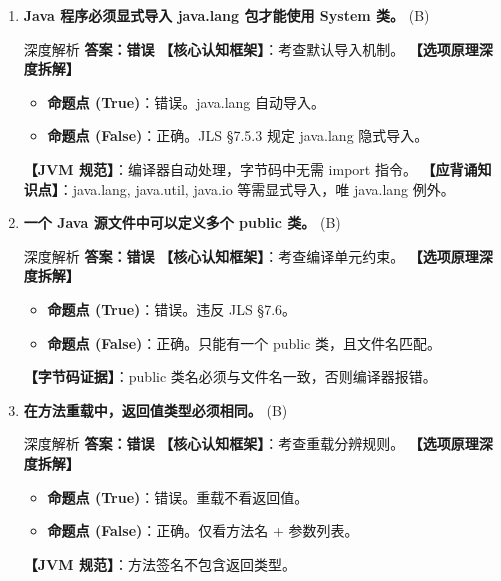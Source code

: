 ﻿\documentclass[12pt, a4paper]{ctexart}
\newcommand{\tfblank}{\underline{\hspace{1.5em}}}
\begin{document}
\begin{enumerate}[label=\textbf{\arabic*.}, itemsep=1em]
	\item \textbf{Java 程序必须显式导入 java.lang 包才能使用 System 类。} \tfblank (B)
	      \begin{bluebox}{深度解析}
		      \textbf{答案：错误}
		      \textbf{【核心认知框架】}：考查默认导入机制。
		      \textbf{【选项原理深度拆解】}
		      \begin{itemize}[leftmargin=*, nosep]
			      \item \textbf{命题点 (True)}：错误。java.lang 自动导入。
			      \item \textbf{命题点 (False)}：正确。JLS §7.5.3 规定 java.lang 隐式导入。
		      \end{itemize}
		      \textbf{【JVM 规范】}：编译器自动处理，字节码中无需 import 指令。
		      \textbf{【应背诵知识点】}：java.lang, java.util, java.io 等需显式导入，唯 java.lang 例外。
	      \end{bluebox}

	\item \textbf{一个 Java 源文件中可以定义多个 public 类。} \tfblank (B)
	      \begin{bluebox}{深度解析}
		      \textbf{答案：错误}
		      \textbf{【核心认知框架】}：考查编译单元约束。
		      \textbf{【选项原理深度拆解】}
		      \begin{itemize}[leftmargin=*, nosep]
			      \item \textbf{命题点 (True)}：错误。违反 JLS §7.6。
			      \item \textbf{命题点 (False)}：正确。只能有一个 public 类，且文件名匹配。
		      \end{itemize}
		      \textbf{【字节码证据】}：public 类名必须与文件名一致，否则编译器报错。
	      \end{bluebox}

	\item \textbf{在方法重载中，返回值类型必须相同。} \tfblank (B)
	      \begin{bluebox}{深度解析}
		      \textbf{答案：错误}
		      \textbf{【核心认知框架】}：考查重载分辨规则。
		      \textbf{【选项原理深度拆解】}
		      \begin{itemize}[leftmargin=*, nosep]
			      \item \textbf{命题点 (True)}：错误。重载不看返回值。
			      \item \textbf{命题点 (False)}：正确。仅看方法名 + 参数列表。
		      \end{itemize}
		      \textbf{【JVM 规范】}：方法签名不包含返回类型。
	      \end{bluebox}


\end{enumerate}
\end{document}
